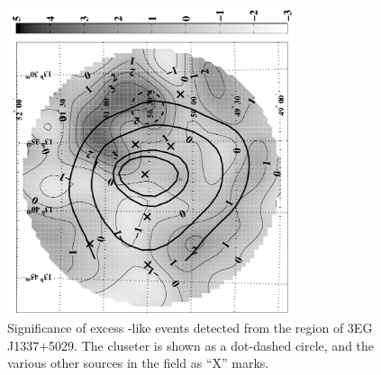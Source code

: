 \begin{figure}[p]
\centerline{\includegraphics[draft=false,angle=270,width=0.75\textwidth]{plots/chap-observations/loenergy/J1337+5029_sigma_conv_bw.pdf}}
\caption{\label{FIG::OBSERVATIONS::J1337SIGMA} Significance of excess
{\Grayc}-like events detected from the region of 3EG J1337$+$5029. The
cluseter is shown as a dot-dashed circle, and the various other sources
in the field as ``X'' marks.}
\end{figure}

